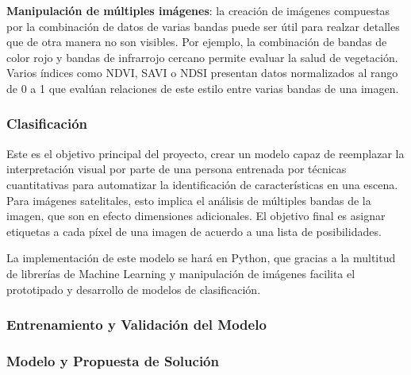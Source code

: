 {\bf Manipulación de múltiples imágenes}: la creación de imágenes compuestas por la combinación de datos de varias
bandas puede ser útil para realzar detalles que de otra manera no son visibles. Por ejemplo, la combinación de bandas
de color rojo y bandas de infrarrojo cercano permite evaluar la salud de vegetación. Varios índices como NDVI, SAVI o
NDSI presentan datos normalizados al rango de 0 a 1 que evalúan relaciones de este estilo entre varias bandas de una
imagen.

\subsubsection{Clasificación}

Este es el objetivo principal del proyecto, crear un modelo capaz de reemplazar la interpretación visual por parte de
una persona entrenada por técnicas cuantitativas para automatizar la identificación de características en una escena.
Para imágenes satelitales, esto implica el análisis de múltiples bandas de la imagen, que son en efecto dimensiones
adicionales. El objetivo final es asignar etiquetas a cada píxel de una imagen de acuerdo a una lista de posibilidades.

La implementación de este modelo se hará en Python, que gracias a la multitud de librerías de Machine Learning y
manipulación de imágenes facilita el prototipado y desarrollo de modelos de clasificación.

\subsubsection{Entrenamiento y Validación del Modelo}
\subsubsection{Modelo y Propuesta de Solución}
